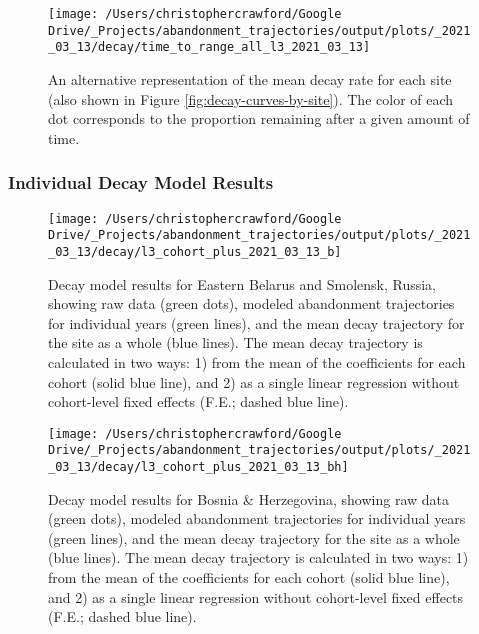 \documentclass[
]{article}
\begin{document}
\begin{figure}
\texttt{[image: /Users/christophercrawford/Google Drive/\_Projects/abandonment\_trajectories/output/plots/\_2021\_03\_13/decay/time\_to\_range\_all\_l3\_2021\_03\_13]} \caption{An alternative representation of the mean decay rate for each site (also shown in Figure \ref{fig:decay-curves-by-site}). The color of each dot corresponds to the proportion remaining after a given amount of time.}\label{fig:decay-time-to-range}
\end{figure}

\hypertarget{individual-decay-model-results}{%
\subsubsection{Individual Decay Model Results}\label{individual-decay-model-results}}























\begin{figure}
\texttt{[image: /Users/christophercrawford/Google Drive/\_Projects/abandonment\_trajectories/output/plots/\_2021\_03\_13/decay/l3\_cohort\_plus\_2021\_03\_13\_b]} \caption{Decay model results for Eastern Belarus and Smolensk, Russia, showing raw data (green dots), modeled abandonment trajectories for individual years (green lines), and the mean decay trajectory for the site as a whole (blue lines). The mean decay trajectory is calculated in two ways: 1) from the mean of the coefficients for each cohort (solid blue line), and 2) as a single linear regression without cohort-level fixed effects (F.E.; dashed blue line).}\label{fig:decay-model-indiv-site-b}
\end{figure}

\begin{figure}
\texttt{[image: /Users/christophercrawford/Google Drive/\_Projects/abandonment\_trajectories/output/plots/\_2021\_03\_13/decay/l3\_cohort\_plus\_2021\_03\_13\_bh]} \caption{Decay model results for Bosnia \& Herzegovina, showing raw data (green dots), modeled abandonment trajectories for individual years (green lines), and the mean decay trajectory for the site as a whole (blue lines). The mean decay trajectory is calculated in two ways: 1) from the mean of the coefficients for each cohort (solid blue line), and 2) as a single linear regression without cohort-level fixed effects (F.E.; dashed blue line).}\label{fig:decay-model-indiv-site-bh}
\end{figure}
\end{document}
